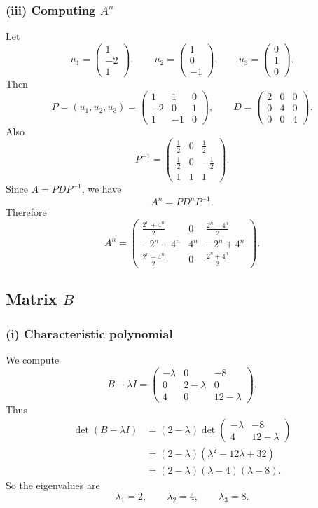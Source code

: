 \documentclass[11pt,a4paper]{article}
\begin{document}
\subsubsection*{(iii) Computing $A^n$}
Let
\[
u_1=\begin{pmatrix}1\\-2\\1\end{pmatrix},
\qquad
u_2=\begin{pmatrix}1\\0\\-1\end{pmatrix},
\qquad
u_3=\begin{pmatrix}0\\1\\0\end{pmatrix}.
\]
Then
\[
P=(u_1,u_2,u_3)=\begin{pmatrix}
1&1&0\\
-2&0&1\\
1&-1&0
\end{pmatrix},
\qquad
D=\begin{pmatrix}
2&0&0\\
0&4&0\\
0&0&4
\end{pmatrix}.
\]
Also
\[
P^{-1}=\begin{pmatrix}
\frac12&0&\frac12\\
\frac12&0&-\frac12\\
1&1&1
\end{pmatrix}.
\]
Since $A=PDP^{-1}$, we have
\[
A^n=PD^nP^{-1}.
\]
Therefore
\[
A^n=
\begin{pmatrix}
\frac{2^n+4^n}{2}&0&\frac{2^n-4^n}{2}\\
-2^n+4^n&4^n&-2^n+4^n\\
\frac{2^n-4^n}{2}&0&\frac{2^n+4^n}{2}
\end{pmatrix}.
\]

\subsection*{Matrix $B$}
\subsubsection*{(i) Characteristic polynomial}
We compute
\[
B-\lambda I=\begin{pmatrix}
-\lambda&0&-8\\
0&2-\lambda&0\\
4&0&12-\lambda
\end{pmatrix}.
\]
Thus
\begin{align*}
\det(B-\lambda I)
&=(2-\lambda)\det\begin{pmatrix}-\lambda&-8\\4&12-\lambda\end{pmatrix}\\
&=(2-\lambda)(\lambda^2-12\lambda+32)\\
&=(2-\lambda)(\lambda-4)(\lambda-8).
\end{align*}
So the eigenvalues are
\[
\lambda_1=2,
\qquad
\lambda_2=4,
\qquad
\lambda_3=8.
\]
\end{document}
